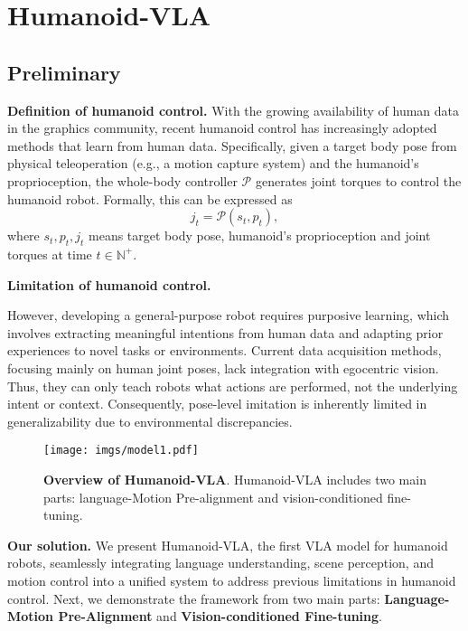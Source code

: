 \section{Humanoid-VLA}


\subsection{Preliminary} 


\textbf{Definition of humanoid control. }
With the growing availability of human data in the graphics community, recent humanoid control has increasingly adopted methods that learn from human data. 
Specifically, given a target body pose from physical teleoperation (e.g., a motion capture system) and the humanoid's proprioception, the whole-body controller $\mathcal{P}$ generates joint torques to control the humanoid robot. Formally, this can be expressed as
\begin{equation}
    j_t = \mathcal{P}(s_t, p_t),
\end{equation}
where $s_t, p_t, j_t$ means target body
pose, humanoid's proprioception and joint torques at time $t\in \mathbb{N}^+$. 

\textbf{Limitation of humanoid control. } 

However, developing a general-purpose robot requires purposive learning, which involves extracting meaningful intentions from human data and adapting prior experiences to novel tasks or environments. 
Current data acquisition methods, focusing mainly on human joint poses, lack integration with egocentric vision. Thus, they can only teach robots what actions are performed, not the underlying intent or context. Consequently, pose-level imitation is inherently limited in generalizability due to environmental discrepancies.



\begin{figure*}[ht]
  \centering
   \texttt{[image: imgs/model1.pdf]}
   \caption{\textbf{Overview of Humanoid-VLA}. Humanoid-VLA includes two main parts: language-Motion Pre-alignment and vision-conditioned fine-tuning. }
   \label{fig:model}
   \vspace{-1.5em}
\end{figure*}



\textbf{Our solution.}
We present Humanoid-VLA, the first VLA model for humanoid robots, seamlessly integrating language understanding, scene perception, and motion control into a unified system to address previous limitations in humanoid control. Next, we demonstrate the framework from two main parts: \textbf{Language-Motion Pre-Alignment} and \textbf{Vision-conditioned Fine-tuning}.


